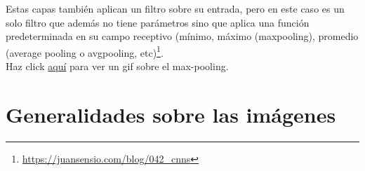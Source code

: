 \documentclass{article}
\begin{document}
Estas capas también aplican un filtro sobre su entrada, pero en este caso es un solo filtro que además no tiene parámetros sino que aplica una función predeterminada en su campo receptivo (mínimo, máximo (maxpooling), promedio (average pooling o avgpooling, etc)\footnote{\url{https://juansensio.com/blog/042_cnns}}.\\

Haz click \href{https://miro.medium.com/max/1456/1*WvHC5bKyrHa7Wm3ca-pXtg.gif}{aquí} para ver un gif sobre el  max-pooling.

\section{Generalidades sobre las imágenes}
\end{document}
